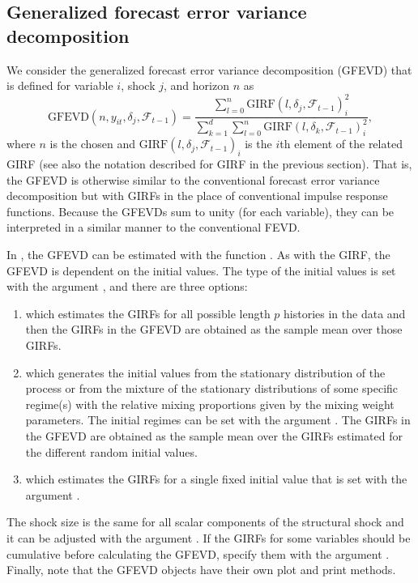 \documentclass[nojss]{jss} %
\begin{document}
\subsection{Generalized forecast error variance decomposition}
We consider the generalized forecast error variance decomposition (GFEVD) \citep{Lanne+Nyberg:2016}  that is defined for variable $i$, shock $j$, and horizon $n$ as
\begin{equation}
\text{GFEVD}(n,y_{it}, \delta_j,\mathcal{F}_{t-1}) = \frac{\sum_{l=0}^n\text{GIRF}(l,\delta_j,\mathcal{F}_{t-1})_i^2}{\sum_{k=1}^d\sum_{l=0}^n\text{GIRF}(l,\delta_k,\mathcal{F}_{t-1})_i^2},
\end{equation}
where $n$ is the chosen and $\text{GIRF}(l,\delta_j,\mathcal{F}_{t-1})_i$ is the $i$th element of the related GIRF (see also the notation described for GIRF in the previous section). That is, the GFEVD is otherwise similar to the conventional forecast error variance decomposition but with GIRFs in the place of conventional impulse response functions. Because the GFEVDs sum to unity (for each variable), they can be interpreted in a similar manner to the conventional FEVD.

In , the GFEVD can be estimated with the function . As with the GIRF, the GFEVD is dependent on the initial values. The type of the initial values is set with the argument , and there are three options:
\begin{enumerate}
\item {} which estimates the GIRFs for all possible length $p$ histories in the data and then the GIRFs in the GFEVD are obtained as the sample mean over those GIRFs.
\item {} which generates the initial values from the stationary distribution of the process or from the mixture of the stationary distributions of some specific regime(s) with the relative mixing proportions given by the mixing weight parameters. The initial regimes can be set with the argument . The GIRFs in the GFEVD are obtained as the sample mean over the GIRFs estimated for the different random initial values.
\item {} which estimates the GIRFs for a single fixed initial value that is set with the argument .
\end{enumerate}
The shock size is the same for all scalar components of the structural shock and it can be adjusted with the argument . If the GIRFs for some variables should be cumulative before calculating the GFEVD, specify them with the argument . Finally, note that the GFEVD objects have their own plot and print methods.
\end{document}
